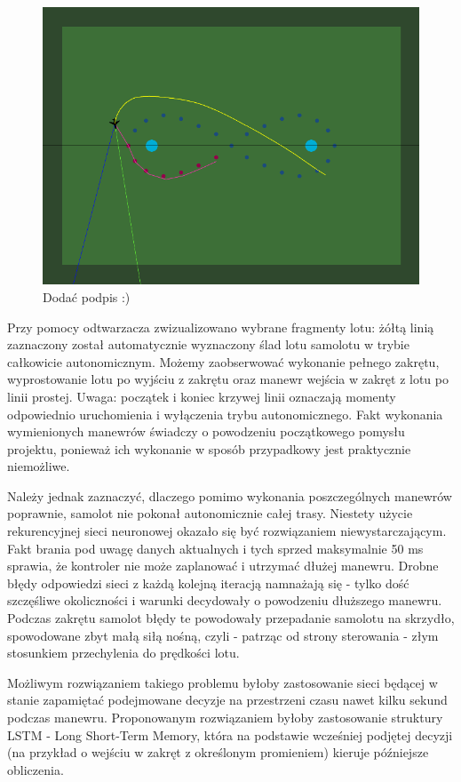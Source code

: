 \documentclass[12pt, a4paper]{article}
\begin{document}
 \begin{figure}[H]
    \centering
    \includegraphics[width=1\textwidth]{aileci3}
    \caption{Dodać podpis :)}
\end{figure}

Przy pomocy odtwarzacza zwizualizowano wybrane fragmenty lotu: żółtą linią zaznaczony został automatycznie wyznaczony ślad lotu samolotu w trybie całkowicie autonomicznym. Możemy zaobserwować wykonanie pełnego zakrętu, wyprostowanie lotu po wyjściu z zakrętu oraz manewr wejścia w zakręt z lotu po linii prostej. Uwaga: początek i koniec krzywej linii oznaczają momenty odpowiednio uruchomienia i wyłączenia trybu autonomicznego. Fakt wykonania wymienionych manewrów świadczy o powodzeniu początkowego pomysłu projektu, ponieważ ich wykonanie w sposób przypadkowy jest praktycznie niemożliwe.

Należy jednak zaznaczyć, dlaczego pomimo wykonania poszczególnych manewrów poprawnie, samolot nie pokonał autonomicznie całej trasy. Niestety użycie rekurencyjnej sieci neuronowej okazało się być rozwiązaniem niewystarczającym. Fakt brania pod uwagę danych aktualnych i tych sprzed maksymalnie 50 ms sprawia, że kontroler nie może zaplanować i utrzymać dłużej manewru. Drobne błędy odpowiedzi sieci z każdą kolejną iteracją namnażają się - tylko dość szczęśliwe okoliczności i warunki decydowały o powodzeniu dłuższego manewru. Podczas zakrętu samolot błędy te powodowały przepadanie samolotu na skrzydło, spowodowane zbyt małą siłą nośną, czyli - patrząc od strony sterowania - złym stosunkiem przechylenia do prędkości lotu.

Możliwym rozwiązaniem takiego problemu byłoby zastosowanie sieci będącej w stanie zapamiętać podejmowane decyzje na przestrzeni czasu nawet kilku sekund podczas manewru. Proponowanym rozwiązaniem byłoby zastosowanie struktury LSTM - Long Short-Term Memory, która na podstawie wcześniej podjętej decyzji (na przykład o wejściu w zakręt z określonym promieniem) kieruje późniejsze obliczenia.
\end{document}

